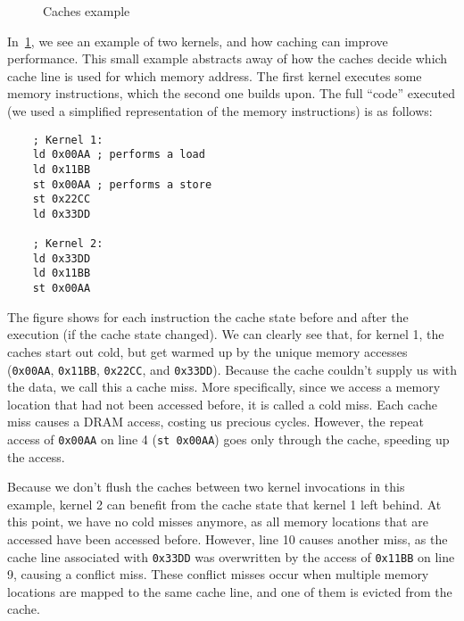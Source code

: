 \begin{figure}[hbt]
    \centering
    \caption{Caches example}
    \label{fig:normal-exec}
\end{figure}

In~\cref{fig:normal-exec}, we see an example of two kernels, and how caching can improve performance.
This small example abstracts away of how the caches decide which cache line is used for which memory address.
The first kernel executes some memory instructions, which the second one builds upon.
The full ``code'' executed (we used a simplified representation of the memory instructions) is as follows:
\begin{verbatim}
    ; Kernel 1:
    ld 0x00AA ; performs a load
    ld 0x11BB
    st 0x00AA ; performs a store
    st 0x22CC
    ld 0x33DD

    ; Kernel 2:
    ld 0x33DD
    ld 0x11BB
    st 0x00AA
\end{verbatim}

The figure shows for each instruction the cache state before and after the execution (if the cache state changed).
We can clearly see that, for kernel 1, the caches start out cold, but get warmed up by the unique memory accesses (\verb|0x00AA|, \verb|0x11BB|, \verb|0x22CC|, and \verb|0x33DD|).
Because the cache couldn't supply us with the data, we call this a cache miss.
More specifically, since we access a memory location that had not been accessed before, it is called a cold miss.
Each cache miss causes a DRAM access, costing us precious cycles.
However, the repeat access of \verb|0x00AA| on line 4 (\texttt{st 0x00AA}) goes only through the cache, speeding up the access.

Because we don't flush the caches between two kernel invocations in this example, kernel 2 can benefit from the cache state that kernel 1 left behind.
At this point, we have no cold misses anymore, as all memory locations that are accessed have been accessed before.
However, line 10 causes another miss, as the cache line associated with \verb|0x33DD| was overwritten by the access of \verb|0x11BB| on line 9, causing a conflict miss.
These conflict misses occur when multiple memory locations are mapped to the same cache line, and one of them is evicted from the cache.

